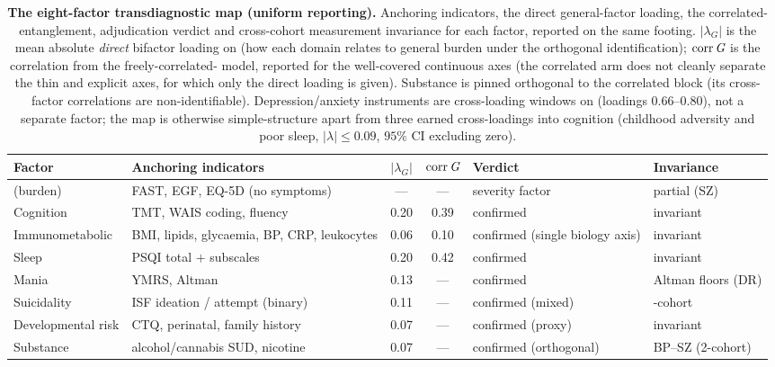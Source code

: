\begin{table}[t]
\centering
\caption{\textbf{The eight-factor transdiagnostic map (uniform reporting).} Anchoring
indicators, the direct general-factor loading, the correlated-\Gfac{} entanglement,
adjudication verdict and cross-cohort measurement invariance for each factor, reported on the
same footing. $|\lambda_G|$ is the mean absolute \emph{direct} bifactor loading on \Gfac{}
(how each domain relates to general burden under the orthogonal identification);
$\mathrm{corr}\,\textit{G}$ is the correlation from the freely-correlated-\Gfac{} model, reported
for the well-covered continuous axes (the correlated arm does not cleanly separate the thin
and explicit axes, for which only the direct loading is given). Substance is pinned orthogonal
to the correlated block (its cross-factor correlations are non-identifiable). Depression/anxiety
instruments are cross-loading windows on \Gfac{} (loadings $0.66$--$0.80$), not a separate
factor; the map is otherwise simple-structure apart from three earned cross-loadings into
cognition (childhood adversity and poor sleep, $|\lambda|\le0.09$, $95\%$ CI excluding zero).}
\label{tab:dimensions}
\small
\renewcommand{\arraystretch}{1.15}
\begin{tabular}{@{}l >{\raggedright\arraybackslash}p{3.4cm} c c >{\raggedright\arraybackslash}p{2.5cm} >{\raggedright\arraybackslash}p{2.2cm}@{}}
\toprule
Factor & Anchoring indicators & $|\lambda_G|$ & $\mathrm{corr}\,\textit{G}$ & Verdict & Invariance \\
\midrule
\Gfac{} (burden)   & FAST, EGF, EQ-5D (no symptoms)        & ---  & ---  & severity factor   & partial (SZ) \\
Cognition          & TMT, WAIS coding, fluency             & 0.20 & 0.39 & confirmed         & invariant \\
Immunometabolic    & BMI, lipids, glycaemia, BP, CRP, leukocytes & 0.06 & 0.10 & confirmed (single biology axis) & invariant \\
Sleep              & PSQI total $+$ subscales              & 0.20 & 0.42 & confirmed         & invariant \\
Mania              & YMRS, Altman                          & 0.13 & ---  & confirmed         & Altman floors (DR) \\
Suicidality        & ISF ideation / attempt (binary)       & 0.11 & ---  & confirmed (mixed) & 3-cohort \\
Developmental risk & CTQ, perinatal, family history        & 0.07 & ---  & confirmed (proxy) & invariant \\
Substance          & alcohol/cannabis SUD, nicotine        & 0.07 & ---  & confirmed (orthogonal) & BP--SZ (2-cohort) \\
\bottomrule
\end{tabular}
\end{table}
